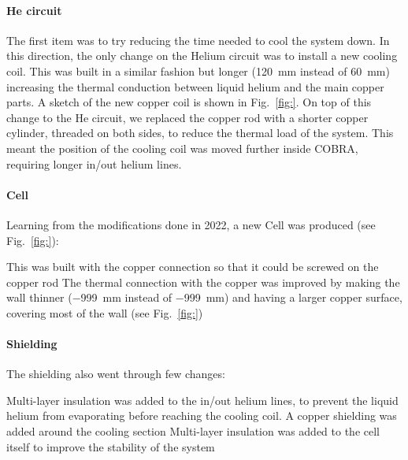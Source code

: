 \begin{refsection}
        \paragraph{He circuit}
        The first item was to try reducing the time needed to cool the system down.
        In this direction, the only change on the Helium circuit was to install a new cooling coil.
        This was built in a similar fashion but longer (\SI{120}{mm} instead of \SI{60}{mm}) increasing the thermal conduction between liquid helium and the main copper parts.
        A sketch of the new copper coil is shown in Fig.~\ref{fig:}.
        On top of this change to the He circuit, we replaced the copper rod with a shorter copper cylinder, threaded on both sides, to reduce the thermal load of the system.
        This meant the position of the cooling coil was moved further inside COBRA, requiring longer in/out helium lines. 
        
        \paragraph{Cell} Learning from the modifications done in 2022, a new Cell was produced (see Fig.~\ref{fig:}):
        \begin{outline}
            \1 This was built with the copper connection so that it could be screwed on the copper rod
            \1 The thermal connection with the copper was improved by making the wall thinner (\SI{-999}{mm} instead of \SI{-999}{mm}) and having a larger copper surface, covering most of the wall (see Fig.~\ref{fig:})
        \end{outline}
        
        \paragraph{Shielding} The shielding also went through few changes:
        \begin{outline}
            \1 Multi-layer insulation was added to the in/out helium lines, to prevent the liquid helium from evaporating before reaching the cooling coil.
            \1 A copper shielding was added around the cooling section
            \1 Multi-layer insulation was added to the cell itself to improve the stability of the system 
        \end{outline}


\end{refsection}
